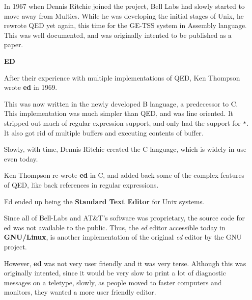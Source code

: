 In 1967 when Dennis Ritchie joined the project, Bell Labs had slowly started to move away from Multics. While he was developing the initial stages of Unix, he rewrote QED yet again, this time for the GE-TSS system in Assembly language.
This was well documented, and was originally intented to be published as a paper.


\textbf{ED}

After their experience with multiple implementations of QED,
Ken Thompson wrote \textbf{ed} in 1969.

This was now written in the newly developed B language, a predecessor to C.
This implementation was much simpler than QED, and was line oriented.
It stripped out much of regular expression support, and only had the support
for \texttt{*}.
It also got rid of multiple buffers and executing contents of buffer.

Slowly, with time, Dennis Ritchie created the C language, which is widely in use
even today.

Ken Thompson re-wrote \textbf{ed} in C, and added back some of the
complex features of QED, like back references in regular expressions.

Ed ended up being the \textbf{Standard Text Editor} for Unix systems.

\begin{remark}
Since all of Bell-Labs and AT\&T's software was proprietary, the source code for ed was not available to the public.
Thus, the \textit{ed} editor accessible today in \textbf{GNU/Linux},
is another implementation of the original \textit{ed} editor
by the GNU project.
\end{remark}

However, \textbf{ed} was not very user friendly and it was very terse.
Although this was originally intented, since it would be
very slow to print a lot of diagnostic messages on a teletype,
slowly, as people moved to faster computers and monitors,
they wanted a more user friendly editor.

